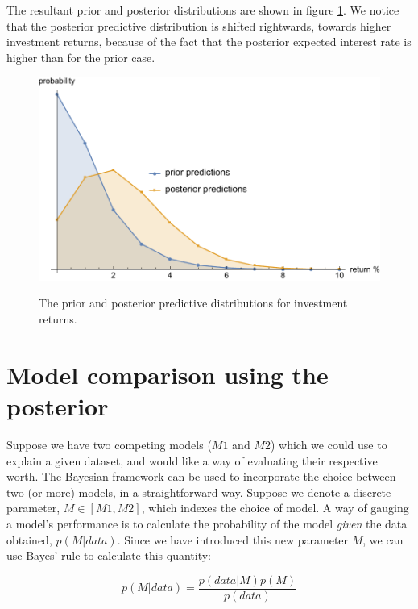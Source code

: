 \documentclass[11pt,fullpage]{book}
\begin{document}
The resultant prior and posterior distributions are shown in figure \ref{fig:Posterior_priorPosteriorPredictiveInterestRate}. We notice that the posterior predictive distribution is shifted rightwards, towards higher investment returns, because of the fact that the posterior expected interest rate is higher than for the prior case.

\begin{figure}
\centering
\scalebox{0.65} 
{\includegraphics{Posterior_priorPosteriorPredictiveInterestRate.pdf}}
\caption{The prior and posterior predictive distributions for investment returns.}\label{fig:Posterior_priorPosteriorPredictiveInterestRate}
\end{figure}

\section{Model comparison using the posterior}
Suppose we have two competing models ($M1$ and $M2$) which we could use to explain a given dataset, and would like a way of evaluating their respective worth. The Bayesian framework can be used to incorporate the choice between two (or more) models, in a straightforward way. Suppose we denote a discrete parameter, $M\in[M1,M2]$, which indexes the choice of model. A way of gauging a model's performance is to calculate the probability of the model \textit{given} the data obtained, $p(M|data)$. Since we have introduced this new parameter $M$, we can use Bayes' rule to calculate this quantity:

\begin{equation}\label{eq:Posterior_modelGivenDataProbability}
p(M|data) = \frac{p(data|M) p(M)}{p(data)}
\end{equation}
\end{document}
